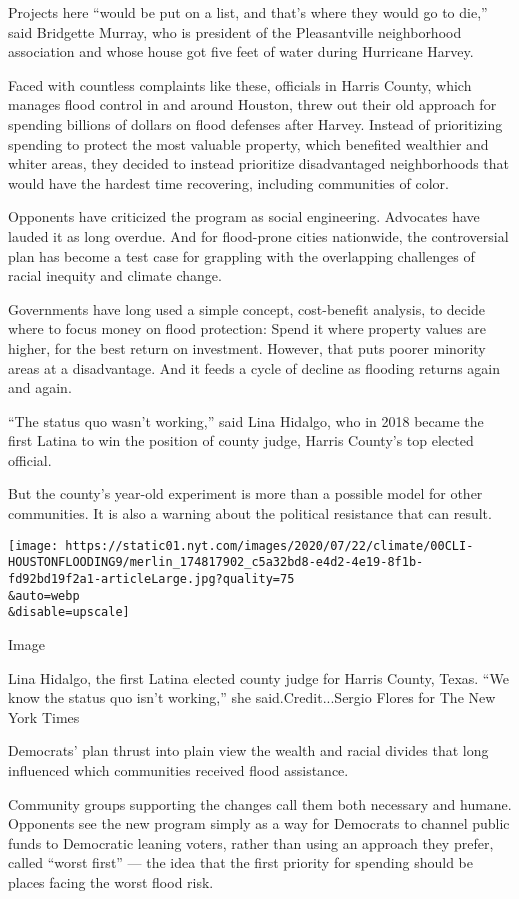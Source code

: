 Projects here ``would be put on a list, and that's where they would go
to die,'' said Bridgette Murray, who is president of the Pleasantville
neighborhood association and whose house got five feet of water during
Hurricane Harvey.

Faced with countless complaints like these, officials in Harris County,
which manages flood control in and around Houston, threw out their old
approach for spending billions of dollars on flood defenses after
Harvey. Instead of prioritizing spending to protect the most valuable
property, which benefited wealthier and whiter areas, they decided to
instead prioritize disadvantaged neighborhoods that would have the
hardest time recovering, including communities of color.

Opponents have criticized the program as social engineering. Advocates
have lauded it as long overdue. And for flood-prone cities nationwide,
the controversial plan has become a test case for grappling with the
overlapping challenges of racial inequity and climate change.

Governments have long used a simple concept, cost-benefit analysis, to
decide where to focus money on flood protection: Spend it where property
values are higher, for the best return on investment. However, that puts
poorer minority areas at a disadvantage. And it feeds a cycle of decline
as flooding returns again and again.

``The status quo wasn't working,'' said Lina Hidalgo, who in 2018 became
the first Latina to win the position of county judge, Harris County's
top elected official.

But the county's year-old experiment is more than a possible model for
other communities. It is also a warning about the political resistance
that can result.

\texttt{[image: https://static01.nyt.com/images/2020/07/22/climate/00CLI-HOUSTONFLOODING9/merlin\_174817902\_c5a32bd8-e4d2-4e19-8f1b-fd92bd19f2a1-articleLarge.jpg?quality=75\\\&auto=webp\\\&disable=upscale]}

Image

Lina Hidalgo, the first Latina elected county judge for Harris County,
Texas. ``We know the status quo isn't working,'' she
said.Credit...Sergio Flores for The New York Times

Democrats' plan thrust into plain view the wealth and racial divides
that long influenced which communities received flood assistance.

Community groups supporting the changes call them both necessary and
humane. Opponents see the new program simply as a way for Democrats to
channel public funds to Democratic leaning voters, rather than using an
approach they prefer, called ``worst first'' --- the idea that the first
priority for spending should be places facing the worst flood risk.

